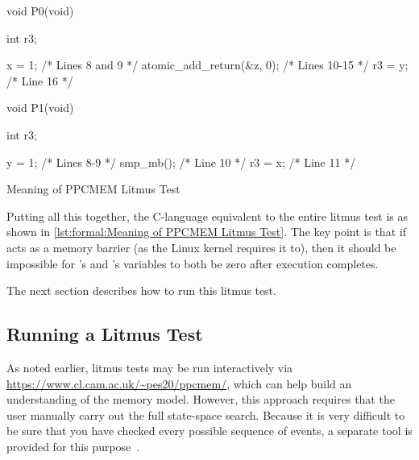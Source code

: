 \QuickQuizEnd

\begin{listing}
\begin{VerbatimL}
void P0(void)
{
	int r3;

	x = 1; /* Lines 8 and 9 */
	atomic_add_return(&z, 0); /* Lines 10-15 */
	r3 = y; /* Line 16 */
}

void P1(void)
{
	int r3;

	y = 1; /* Lines 8-9 */
	smp_mb(); /* Line 10 */
	r3 = x; /* Line 11 */
}
\end{VerbatimL}
\caption{Meaning of PPCMEM Litmus Test}
\label{lst:formal:Meaning of PPCMEM Litmus Test}
\end{listing}

Putting all this together, the C-language equivalent to the entire litmus
test is as shown in
\cref{lst:formal:Meaning of PPCMEM Litmus Test}.
The key point is that if  acts as a 
{memory barrier} (as the Linux kernel requires it to),
then it should be impossible for 's and 's 
variables to both be zero after execution completes.

The next section describes how to run this litmus test.

\subsection{Running a Litmus Test}
\label{sec:formal:Running a Litmus Test}

As noted earlier, litmus tests may be run interactively via
\url{https://www.cl.cam.ac.uk/~pes20/ppcmem/}, which can help build an
understanding of the memory model.
However, this approach requires that the user manually carry out the
full state-space search.
Because it is very difficult to be sure that you have checked every
possible sequence of events, a separate tool is provided for this
purpose~\cite{PaulEMcKenney2011ppcmem}.

